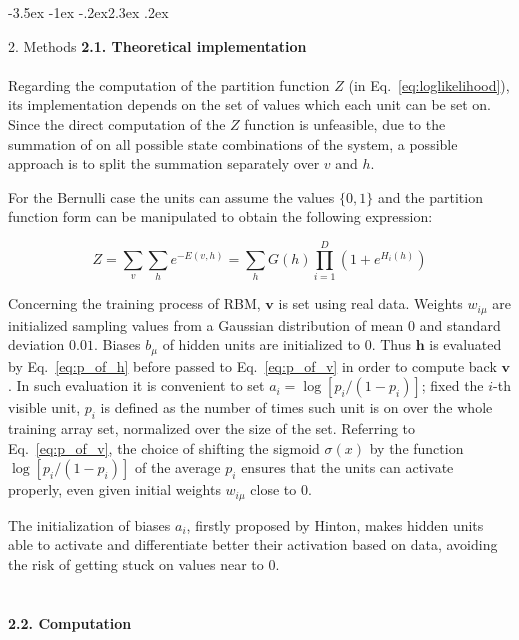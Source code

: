 \documentclass[prl,twocolumn]{revtex4-1}
\makeatletter
\renewcommand{\section}{\@startsection{section}{1}{\z@}%
	{-3.5ex \@plus -1ex \@minus -.2ex}{2.3ex \@plus.2ex}%
	{\normalfont\bfseries\raggedright}}
\makeatother
\begin{document}
\section{2. Methods}
\noindent\textbf{2.1. Theoretical implementation}
\\
\\
Regarding the computation of the partition function $Z$ (in Eq.~\ref{eq:loglikelihood}), its implementation depends on the set of values which each unit can be set on. Since the direct computation of the $Z$ function is unfeasible, due to the summation of on all possible state combinations of the system, a possible approach is to split the summation separately over $v$ and $h$.

For the Bernulli case the units can assume the values $\{0,1\}$ and the partition function form can be manipulated to obtain the following expression:

\begin{equation}
	Z=\sum_v\sum_h{e^{-E(v,h)}}=\sum_h{G(h)\prod_{i=1}^D{\left(1+e^{H_i(h)}\right)}}
	\label{eq:Z_function_bernulli}
\end{equation}

Concerning the training process of RBM, $\mathbf{v}$ is set using real data. Weights $w_{i\mu}$ are initialized sampling values from a Gaussian distribution of mean $0$ and standard deviation $0.01$. Biases $b_\mu$ of hidden units are initialized to $0$. Thus $\mathbf{h}$ is evaluated by Eq.~\ref{eq:p_of_h} before passed to Eq.~\ref{eq:p_of_v} in order to compute back $\mathbf{v}$. In such evaluation it is convenient to set $a_i=\log[p_i/(1-p_i)]$; fixed the $i$-th visible unit, $p_i$ is defined as the number of times such unit is on over the whole training array set, normalized over the size of the set. Referring to Eq.~\ref{eq:p_of_v}, the choice of shifting the sigmoid $\sigma(x)$ by the function $\log[p_i/(1-p_i)]$ of the average $p_i$ ensures that the units can activate properly, even given initial weights $w_{i\mu}$ close to $0$.

The initialization of biases $a_i$, firstly proposed by Hinton, makes hidden units able to activate and differentiate better their activation based on data, avoiding the risk of getting stuck on values near to $0$.
\\
\\
\\
\noindent\textbf{2.2. Computation}
\\
\\
\end{document}
